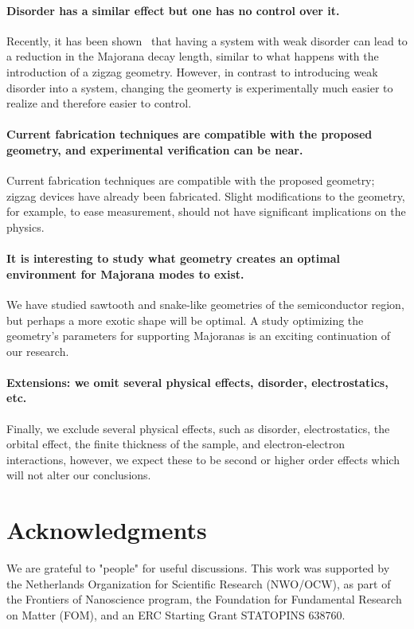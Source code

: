 \documentclass[english, twocolumn, 10pt, aps, superscriptaddress, floatfix, prb, citeautoscript]{revtex4-1}
\renewcommand{\comment}[2]{#2}
\renewcommand{\comment}{\paragraph}
\begin{document}
\comment{Disorder has a similar effect but one has no control over it.}
Recently, it has been shown~\cite{haim_double-edge_2018} that having a system with weak disorder can lead to a reduction in the Majorana decay length, similar to what happens with the introduction of a zigzag geometry.
However, in contrast to introducing weak disorder into a system, changing the geomerty is experimentally much easier to realize and therefore easier to control.

\comment{Current fabrication techniques are compatible with the proposed geometry, and experimental verification can be near.}
Current fabrication techniques are compatible with the proposed geometry; zigzag devices have already been fabricated. %
Slight modifications to the geometry, for example, to ease measurement, should not have significant implications on the physics.

\comment{It is interesting to study what geometry creates an optimal environment for Majorana modes to exist.}
We have studied sawtooth and snake-like geometries of the semiconductor region, but perhaps a more exotic shape will be optimal.
A study optimizing the geometry's parameters for supporting Majoranas is an exciting continuation of our research.

\comment{Extensions: we omit several physical effects, disorder, electrostatics, etc.}
Finally, we exclude several physical effects, such as disorder, electrostatics, the orbital effect, the finite thickness of the sample, and electron-electron interactions, however, we expect these to be second or higher order effects which will not alter our conclusions.

\section{Acknowledgments}
We are grateful to "people" for useful discussions.
This work was supported by the Netherlands Organization for Scientific Research (NWO/OCW), as part of the Frontiers of Nanoscience program, the Foundation for Fundamental Research on Matter (FOM), and an ERC Starting Grant STATOPINS 638760.



\end{document}
